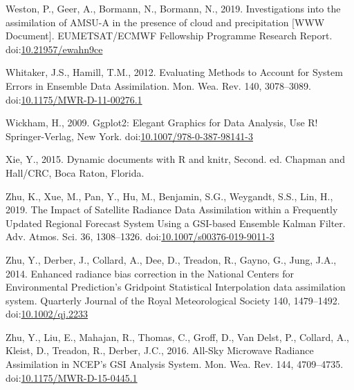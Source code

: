 \documentclass[final,5p,times,twocolumn,authoryear]{elsarticle} %
\begin{document}
\leavevmode\hypertarget{ref-weston2019}{}%
Weston, P., Geer, A., Bormann, N., Bormann, N., 2019. Investigations into the assimilation of AMSU-A in the presence of cloud and precipitation {[}WWW Document{]}. EUMETSAT/ECMWF Fellowship Programme Research Report. doi:\href{https://doi.org/10.21957/ewahn9ce}{10.21957/ewahn9ce}

\leavevmode\hypertarget{ref-whitaker2012}{}%
Whitaker, J.S., Hamill, T.M., 2012. Evaluating Methods to Account for System Errors in Ensemble Data Assimilation. Mon. Wea. Rev. 140, 3078--3089. doi:\href{https://doi.org/10.1175/MWR-D-11-00276.1}{10.1175/MWR-D-11-00276.1}

\leavevmode\hypertarget{ref-wickham2009}{}%
Wickham, H., 2009. Ggplot2: Elegant Graphics for Data Analysis, Use R! Springer-Verlag, New York. doi:\href{https://doi.org/10.1007/978-0-387-98141-3}{10.1007/978-0-387-98141-3}

\leavevmode\hypertarget{ref-xie2015}{}%
Xie, Y., 2015. Dynamic documents with R and knitr, Second. ed. Chapman and Hall/CRC, Boca Raton, Florida.

\leavevmode\hypertarget{ref-zhu2019}{}%
Zhu, K., Xue, M., Pan, Y., Hu, M., Benjamin, S.G., Weygandt, S.S., Lin, H., 2019. The Impact of Satellite Radiance Data Assimilation within a Frequently Updated Regional Forecast System Using a GSI-based Ensemble Kalman Filter. Adv. Atmos. Sci. 36, 1308--1326. doi:\href{https://doi.org/10.1007/s00376-019-9011-3}{10.1007/s00376-019-9011-3}

\leavevmode\hypertarget{ref-zhu2014}{}%
Zhu, Y., Derber, J., Collard, A., Dee, D., Treadon, R., Gayno, G., Jung, J.A., 2014. Enhanced radiance bias correction in the National Centers for Environmental Prediction's Gridpoint Statistical Interpolation data assimilation system. Quarterly Journal of the Royal Meteorological Society 140, 1479--1492. doi:\href{https://doi.org/10.1002/qj.2233}{10.1002/qj.2233}

\leavevmode\hypertarget{ref-zhu2016}{}%
Zhu, Y., Liu, E., Mahajan, R., Thomas, C., Groff, D., Van Delst, P., Collard, A., Kleist, D., Treadon, R., Derber, J.C., 2016. All-Sky Microwave Radiance Assimilation in NCEP's GSI Analysis System. Mon. Wea. Rev. 144, 4709--4735. doi:\href{https://doi.org/10.1175/MWR-D-15-0445.1}{10.1175/MWR-D-15-0445.1}
\end{document}
